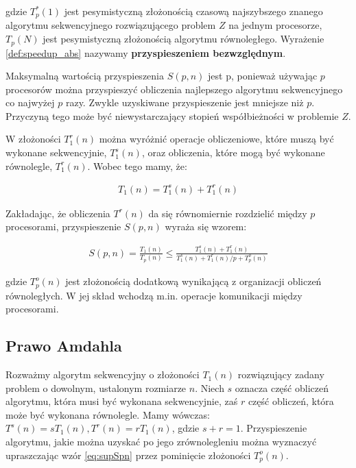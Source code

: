 gdzie \(T^{*}_{p}(1)\) jest pesymistyczną złożonością czasową najszybszego znanego algorytmu sekwencyjnego rozwiązującego problem \(Z\) na jednym procesorze, \(T_{p}(N)\) jest pesymistyczną złożonością algorytmu równoległego. Wyrażenie \ref{def:speedup_abs} nazywamy \textbf{przyspieszeniem bezwzględnym}.

Maksymalną wartością przyspieszenia \(S(p,n)\) jest p, ponieważ używając \(p\) procesorów można przyspieszyć obliczenia najlepszego algorytmu sekwencyjnego co najwyżej \(p\) razy. Zwykle uzyskiwane przyspieszenie jest mniejsze niż \(p\). Przyczyną tego może być niewystarczający stopień współbieżności w problemie \(Z\). 



W złożoności \(T^{r}_{1}(n)\) można wyróżnić operacje obliczeniowe, które muszą być wykonane sekwencyjnie, \(T^{s}_{1}(n)\), oraz obliczenia, które mogą być wykonane równolegle, \(T^{r}_{1}(n)\). Wobec tego mamy, że:

\begin{align}
T_{1}(n) = T^{s}_{1}(n) + T^{r}_{1}(n)
\end{align}

Zakładając, że obliczenia \(T^{r}(n)\) da się równomiernie rozdzielić między \(p\) procesorami, przyspieszenie \(S(p, n)\) wyraża się wzorem:

\begin{align}\label{eq:supSpn}
S(p, n) = \frac{T_{1}(n)}{T_{p}(n)}\leq\frac{T^{s}_{1}(n) + T^{r}_{1}(n)}{T^{s}_{1}(n) + T^{r}_{1}(n)/p + T^{o}_{p}(n)}
\end{align}


gdzie \(T^{o}_{p}(n)\) jest złożonością dodatkową wynikającą z organizacji obliczeń równoległych. W jej skład wchodzą m.in. operacje komunikacji między procesorami.




\subsection{Prawo Amdahla}

Rozważmy algorytm sekwencyjny o złożoności \(T_1(n)\) rozwiązujący zadany problem o dowolnym, ustalonym rozmiarze \(n\). Niech \(s\) oznacza część obliczeń algorytmu, która musi być wykonana sekwencyjnie, zaś \(r\) część obliczeń, która może być wykonana równolegle. Mamy wówczas: \(T^{s}(n) = sT_{1}(n), T^{r}(n)=rT_{1}(n)\), gdzie \(s+r=1\). Przyspieszenie algorytmu, jakie można uzyskać po jego zrównolegleniu można wyznaczyć upraszczając wzór \eqref{eq:supSpn} przez pominięcie złożoności \(T^{o}_{p}(n)\).

